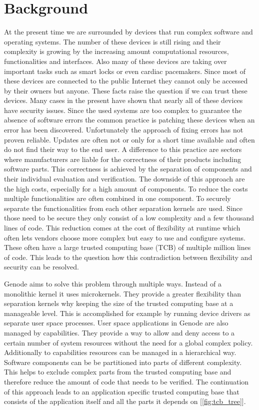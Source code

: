 \documentclass[
a4paper,
12pt,
notitlepage,
parskip=half,
DIV=11,
]{scrbook}
\begin{document}
	
	\tableofcontents
	
	\chapter{Background}
		At the present time we are surrounded by devices that run complex software and operating systems.
		The number of these devices is still rising and their complexity is growing by the increasing amount computational resources, functionalities and interfaces.
		Also many of these devices are taking over important tasks such as smart locks or even cardiac pacemakers.
		Since most of these devices are connected to the public Internet they cannot only be accessed by their owners but anyone.
		These facts raise the question if we can trust these devices.
		Many cases in the present have shown that nearly all of these devices have security issues.
		Since the used systems are too complex to guarantee the absence of software errors the common practice is patching these devices when an error has been discovered.
		Unfortunately the approach of fixing errors has not proven reliable.
		Updates are often not or only for a short time available and often do not find their way to the end user.
		A difference to this practice are sectors where manufacturers are liable for the correctness of their products including software parts.
		This correctness is achieved by the separation of components and their individual evaluation and verification.
		The downside of this approach are the high costs, especially for a high amount of components.
		To reduce the costs multiple functionalities are often combined in one component.
		To securely separate the functionalities from each other separation kernels are used.
		Since those need to be secure they only consist of a low complexity and a few thousand lines of code.
		This reduction comes at the cost of flexibility at runtime which often lets vendors choose more complex but easy to use and configure systems.
		These often have a large trusted computing base (TCB) of multiple million lines of code.
		This leads to the question how this contradiction between flexibility and security can be resolved.
		
		Genode aims to solve this problem through multiple ways.
		Instead of a monolithic kernel it uses microkernels.
		They provide a greater flexibility than separation kernels why keeping the size of the trusted computing base at a manageable level.
		This is accomplished for example by running device drivers as separate user space processes.
		User space applications in Genode are also managed by capabilities.
		They provide a way to allow and deny access to a certain number of system resources without the need for a global complex policy.
		Additionally to capabilities resources can be managed in a hierarchical way.
		Software components can be be partitioned into parts of different complexity.
		This helps to exclude complex parts from the trusted computing base and therefore reduce the amount of code that needs to be verified.
		The continuation of this approach leads to an application specific trusted computing base that consists of the application itself and all the parts it depends on [\ref{fig:tcb_tree}].
		\citep{genode}
		
\end{document}
